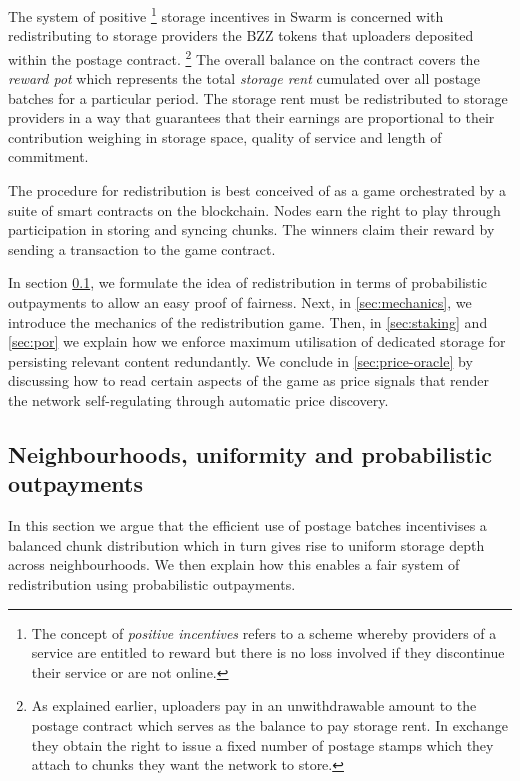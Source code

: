 The system of positive%
%
\footnote{The concept of \emph{positive incentives} refers to a scheme whereby providers of a service are entitled to reward but there is no loss involved if they discontinue their service or are not online.}
%
storage incentives in Swarm is concerned with redistributing  to storage providers the BZZ tokens that uploaders deposited within the postage contract.%
%
\footnote{As explained earlier, uploaders pay in an unwithdrawable amount to the postage contract which serves as the balance to pay storage rent. In exchange they obtain the right to issue a fixed number of postage stamps which they attach to chunks they want the network to store.}
%
The overall balance on the contract covers the \emph{reward pot} which represents the total \emph{storage rent} cumulated over all postage batches for a particular period. The storage rent must be redistributed to storage providers in a way that guarantees that their earnings are proportional to their contribution weighing in storage space, quality of service and length of commitment.

The procedure for redistribution is best conceived of as a game orchestrated by a suite of smart contracts on the blockchain. Nodes earn the right to play through participation in storing and syncing chunks.  
The winners claim their reward by sending a transaction to the game contract. 

In section \ref{sec:uniformity-pot}, we formulate the idea of redistribution in terms of probabilistic outpayments to allow an easy proof of fairness. Next, in \ref{sec:mechanics}, we introduce the mechanics of the redistribution game.
Then, in \ref{sec:staking} and \ref{sec:por} we explain how we enforce maximum utilisation of dedicated storage for persisting  relevant content redundantly. We conclude in \ref{sec:price-oracle} by discussing how to read certain aspects of the game as price signals that render the network self-regulating through automatic price discovery. 

\subsection{Neighbourhoods, uniformity and probabilistic outpayments}\label{sec:uniformity-pot} 

In this section we argue that the efficient use of postage batches incentivises a balanced chunk distribution which in turn gives rise to uniform storage depth across neighbourhoods. We then explain how this enables a fair system of redistribution using probabilistic outpayments.


